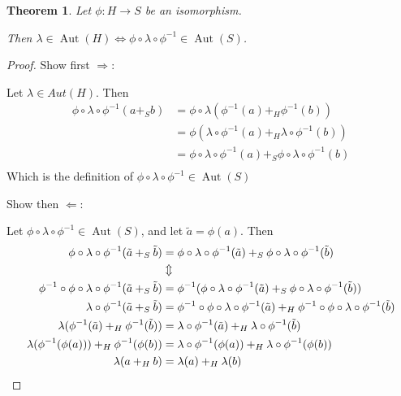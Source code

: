 \documentclass[a4paper, 12pt, english]{article}
\theoremstyle{plain}
\newtheorem{theorem}{Theorem}[section]
\theoremstyle{definition}
\DeclareMathOperator{\Aut}{Aut}
\begin{document}
\begin{theorem} \label{thm:conjugacy-automorphism}
    Let \( \phi: H \to S \) be an isomorphism.

    Then \( \lambda \in \Aut(H) \iff \phi \circ \lambda \circ \phi^{-1} \in \Aut(S) \).
\end{theorem}
\begin{proof}
    Show first \( \Rightarrow \):

    Let \( \lambda \in Aut(H) \). Then
    \begin{align*}
        \phi \circ \lambda \circ \phi^{-1} (a +_S b) &= \phi \circ \lambda(\phi^{-1}(a) +_H \phi^{-1}(b)) \\
        &= \phi(\lambda \circ \phi^{-1}(a) +_H \lambda \circ \phi^{-1}(b)) \\
        &= \phi \circ \lambda \circ \phi^{-1}(a) +_S \phi \circ \lambda \circ \phi^{-1}(b) \\
    \end{align*}
    Which is the definition of \( \phi \circ \lambda \circ \phi^{-1} \in \Aut(S) \)

    Show then \( \Leftarrow \):

    Let \( \phi \circ \lambda \circ \phi^{-1} \in \Aut(S) \), and let \( \tilde{a} = \phi(a) \). Then
    \begin{align*}
        \phi \circ \lambda \circ \phi^{-1} (\tilde{a} +_S \tilde{b}) &= \phi \circ \lambda \circ \phi^{-1}(\tilde{a}) +_S \phi \circ \lambda \circ \phi^{-1}(\tilde{b}) \\
        &\Updownarrow \\
        \phi^{-1} \circ \phi \circ \lambda \circ \phi^{-1} (\tilde{a} +_S \tilde{b}) &= \phi^{-1}(\phi \circ \lambda \circ \phi^{-1}(\tilde{a}) +_S \phi \circ \lambda \circ \phi^{-1}(\tilde{b})) \\
        \lambda \circ \phi^{-1} (\tilde{a} +_S \tilde{b}) &= \phi^{-1} \circ \phi \circ \lambda \circ \phi^{-1} (\tilde{a}) +_H \phi^{-1} \circ \phi \circ \lambda \circ \phi^{-1} (\tilde{b}) \\
        \lambda(\phi^{-1}(\tilde{a}) +_H \phi^{-1}(\tilde{b})) &= \lambda \circ \phi^{-1} (\tilde{a}) +_H \lambda \circ \phi^{-1} (\tilde{b}) \\
        \lambda(\phi^{-1}(\phi(a))) +_H \phi^{-1}(\phi(b)) &= \lambda \circ \phi^{-1} (\phi(a)) +_H \lambda \circ \phi^{-1} (\phi(b)) \\
        \lambda(a +_H b) &= \lambda(a) +_H \lambda(b) \qedhere
    \end{align*}
\end{proof}
\end{document}
